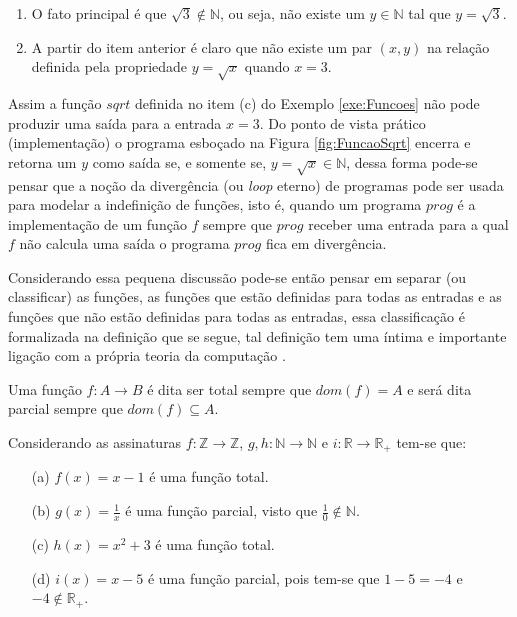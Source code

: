 \begin{enumerate}
	\item O fato principal é que $\sqrt{3} \notin \mathbb{N}$, ou seja, não existe um $y \in \mathbb{N}$ tal que $y = \sqrt{3}$.
	\item A partir do item anterior é claro que não existe um par $(x, y)$ na relação definida pela propriedade $y = \sqrt{x}$ quando $x = 3$.	
\end{enumerate}

Assim a função $sqrt$ definida no item (c) do Exemplo \ref{exe:Funcoes} não pode produzir uma saída para a entrada $x = 3$. Do ponto de vista prático (implementação) o programa esboçado na Figura \ref{fig:FuncaoSqrt} encerra e retorna um $y$ como saída se, e somente se,  $y = \sqrt{x} \in \mathbb{N}$, dessa forma pode-se pensar que a noção da divergência (ou \textit{loop} eterno) de programas pode ser usada para modelar a indefinição de funções, isto é, quando um programa $prog$ é a implementação de um função $f$ sempre que $prog$ receber uma entrada para a qual $f$ não calcula uma saída o programa $prog$ fica em divergência.

Considerando essa pequena discussão pode-se então pensar em separar (ou classificar) as funções, as funções que estão definidas para todas as entradas e as funções que não estão definidas para todas as entradas, essa classificação é formalizada na definição que se segue, tal definição tem uma íntima e importante ligação com a própria teoria da computação \cite{benjaLivro2010, hopcroft2008}.

\begin{definicao}
	Uma função $f: A \rightarrow B$ é dita ser total sempre que $dom(f) = A$ e será dita parcial sempre que $dom(f) \subseteq A$.
\end{definicao}

\begin{exemplo}\label{exem:FuncoesTotaisParciais1}
	Considerando as assinaturas $f: \mathbb{Z} \rightarrow \mathbb{Z}$, $g, h: \mathbb{N} \rightarrow \mathbb{N}$ e $i: \mathbb{R} \rightarrow \mathbb{R}_+$ tem-se que:
	\begin{itemize}
		\item[(a)] $f(x) = x - 1$ é uma função total. 
		\item[(b)] $g(x) = \displaystyle\frac{1}{x}$ é uma função parcial, visto que $\displaystyle\frac{1}{0} \notin \mathbb{N}$.
		\item[(c)] $h(x) = x^2 + 3$ é uma função total.
		\item[(d)] $i(x) = x - 5$ é uma função parcial, pois tem-se que $1 - 5 = -4$ e $-4 \notin \mathbb{R}_+$.
	\end{itemize}
\end{exemplo}

